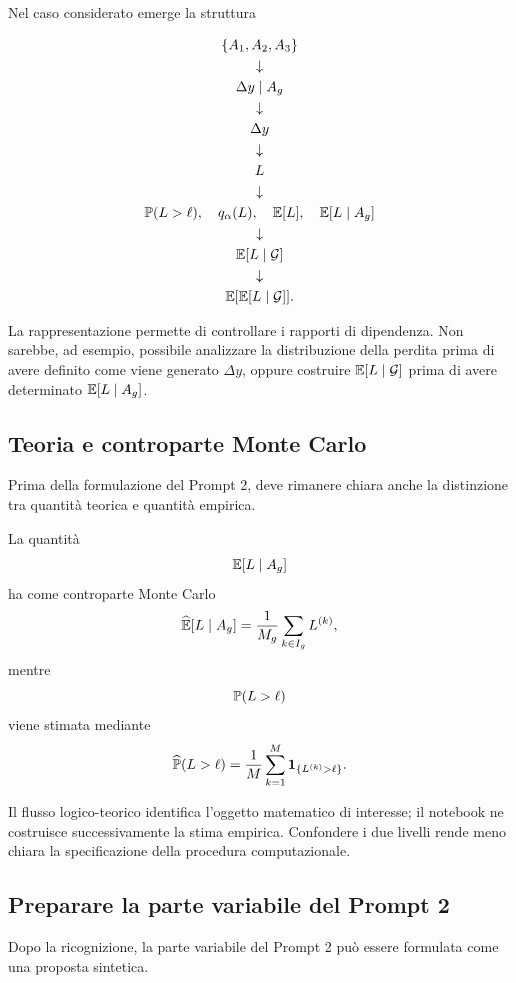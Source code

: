 Nel caso considerato emerge la struttura

\[
\begin{array}{c}
\{A_{1},A_{2},A_{3}\}
\\[3pt]
\downarrow
\\[3pt]
\Delta y\mid A_g
\\[3pt]
\downarrow
\\[3pt]
\Delta y
\\[3pt]
\downarrow
\\[3pt]
L
\\[3pt]
\downarrow
\\[3pt]
\mathbb{P}(L>\ell),\quad
q_{\alpha}(L),\quad \mathbb{E}[L],\quad \mathbb{E}[L\mid A_g]
\\[3pt]
\downarrow
\\[3pt]
\mathbb{E}[L\mid\mathcal{G}]
\\[3pt]
\downarrow
\\[3pt]
\mathbb{E}[\mathbb{E}[L\mid\mathcal{G}]].
\end{array}
\]

La rappresentazione permette di controllare i rapporti di dipendenza. Non
sarebbe, ad esempio, possibile analizzare la distribuzione della perdita prima
di avere definito come viene generato $\Delta y$, oppure costruire
$\mathbb{E}[L\mid\mathcal{G}]$ prima di avere determinato $\mathbb{E}[L\mid A_g]$.

\subsection{Teoria e controparte Monte Carlo}

Prima della formulazione del Prompt 2, deve rimanere chiara anche la distinzione
tra quantit\`{a} teorica e quantit\`{a} empirica.

La quantit\`{a}
\[
\mathbb{E}[L\mid A_g]
\]
ha come controparte Monte Carlo
\[
\widehat{\mathbb{E}}[L\mid A_g]
=
\frac{1}{M_g}
\sum_{k\in I_g}L^{(k)},
\]
mentre
\[
\mathbb{P}(L>\ell)
\]
viene stimata mediante
\[
\widehat{\mathbb{P}}(L>\ell)
=
\frac{1}{M}
\sum_{k=1}^{M}
\mathbf{1}_{\{L^{(k)}>\ell\}}.
\]

Il flusso logico-teorico identifica l'oggetto matematico di interesse; il
notebook ne costruisce successivamente la stima empirica. Confondere i due
livelli rende meno chiara la specificazione della procedura computazionale.

\subsection{Preparare la parte variabile del Prompt 2}

Dopo la ricognizione, la parte variabile del Prompt 2 pu\`{o} essere formulata
come una proposta sintetica.

